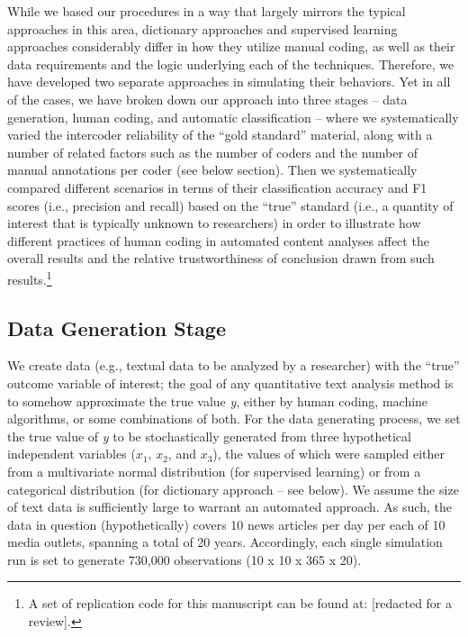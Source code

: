 \documentclass[man, 12pt, a4paper, nolmodern, noextraspace]{apa6}
\begin{document}
    While we based our procedures in a way that largely mirrors the typical approaches in this area, dictionary approaches and supervised learning approaches considerably differ in how they utilize manual coding, as well as their data requirements and the logic underlying each of the techniques. Therefore, we have developed two separate approaches in simulating their behaviors. Yet in all of the cases, we have broken down our approach into three stages – data generation, human coding, and automatic classification – where we systematically varied the intercoder reliability of the “gold standard” material, along with a number of related factors such as the number of coders and the number of manual annotations per coder (see below section). Then we systematically compared different scenarios in terms of their classification accuracy and F1 scores (i.e., precision and recall) based on the \enquote{true} standard (i.e., a quantity of interest that is typically unknown to researchers) in order to illustrate how different practices of human coding in automated content analyses affect the overall results and the relative trustworthiness of conclusion drawn from such results.\footnote{ A set of replication code for this manuscript can be found at: [redacted for a review].}
    
    \subsection{Data Generation Stage}
    
    We create data (e.g., textual data to be analyzed by a researcher) with the \enquote{true} outcome variable of interest; the goal of any quantitative text analysis method is to somehow approximate the true value \textit{y}, either by human coding, machine algorithms, or some combinations of both. For the data generating process, we set the true value of \textit{y} to be stochastically generated from three hypothetical independent variables ($x_1$, $x_2$, and $x_3$), the values of which were sampled either from a multivariate normal distribution (for supervised learning) or from a categorical distribution (for dictionary approach -- see below). We assume the size of text data is sufficiently large to warrant an automated approach. As such, the data in question (hypothetically) covers 10 news articles per day per each of 10 media outlets, spanning a total of 20 years. Accordingly, each single simulation run is set to generate 730,000 observations (10 x 10 x 365 x 20).
    
\end{document}
